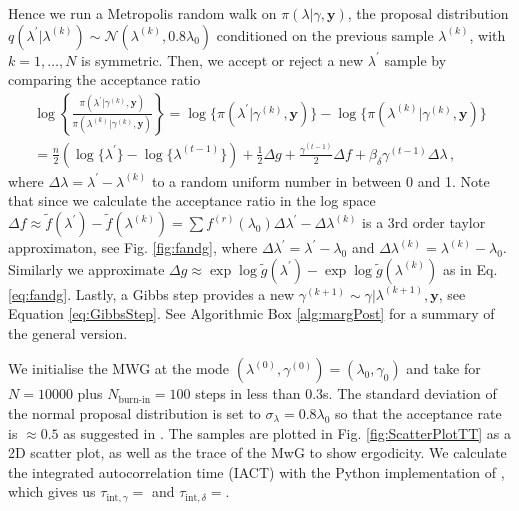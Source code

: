 Hence we run a Metropolis random walk on $\pi(\lambda | \gamma, \bm{y})$, the proposal distribution $q(\lambda^\prime|\lambda^{(k)}) \sim \mathcal{N}(\lambda^{(k)}, 0.8 \lambda_{0})$ conditioned on the previous sample $\lambda^{(k)}$, with $k = 1 , \dots, N$ is symmetric.
Then, we accept or reject a new $\lambda^{\prime}$ sample by comparing the acceptance ratio
\begin{align} 
	\log \left\{ \frac{\pi(\lambda^{\prime} | \gamma^{(k)}, \bm{y})  }{\pi(\lambda^{(k)}| \gamma^{(k)}, \bm{y})}  \right\} 
	= \log  \{\pi(\lambda^{\prime} | \gamma^{(k)}, \bm{y} ) \}  -\log  \{ \pi(\lambda^{(k)}| \gamma^{(k)}, \bm{y}) \} \\
	= \frac{n}{2} (\log\{\lambda^{\prime}\} - \log\{\lambda^{(t-1)}\} ) + \frac{1}{2} \Delta g + \frac{\gamma^{(t-1)}}{2} \Delta f  + \beta_\delta \gamma^{(t-1)} \Delta \lambda  \, ,
\end{align}
where $\Delta \lambda = \lambda^{\prime} - \lambda^{(k)} $ to a random uniform number in between 0 and 1.
Note that since we calculate the acceptance ratio in the log space $\Delta f \approx \tilde{f}(\lambda^\prime) - \tilde{f}(\lambda^{(k)}) = \sum f^{(r)} (\lambda_0)\Delta \lambda^\prime - \Delta \lambda^{(k)} $ is a 3rd order taylor approximaton, see Fig. \ref{fig:fandg}, where $\Delta \lambda^{\prime} = \lambda^\prime - \lambda_0 $ and $\Delta \lambda^{(k)} =  \lambda^{(k)} - \lambda_0$.
Similarly we approximate $\Delta g \approx \exp{\log{\tilde{g}(\lambda^{\prime})}} - \exp{\log{\tilde{g}(\lambda^{(k)})}}$ as in Eq. \ref{eq:fandg}.
Lastly, a Gibbs step provides a new $\gamma^{(k+1)} \sim \gamma | \lambda^{(k+1)}, \bm{y}$, see Equation \eqref{eq:GibbsStep}.
See Algorithmic Box \ref{alg:margPost} for a summary of the general version.

We initialise the MWG at the mode $( \lambda^{(0)} , \gamma^{(0)}  ) = ( \lambda_{0} , \gamma_{0}  )$ and take for $N = 10000$ plus $N_{\text{burn-in}} = 100$ steps in less than $0.3$s.
The standard deviation of the normal proposal distribution is set to $\sigma_{\lambda} = 0.8 \lambda_0$ so that the acceptance rate is $\approx 0.5$ as suggested in \cite{}.
The samples are plotted in Fig. \ref{fig:ScatterPlotTT} as a 2D scatter plot, as well as the trace of the MwG to show ergodicity.
We calculate the integrated autocorrelation time (IACT) with the Python implementation of \cite{}, which gives us $\tau_{\text{int}, \gamma} = $ and $\tau_{\text{int}, \delta} = $.


